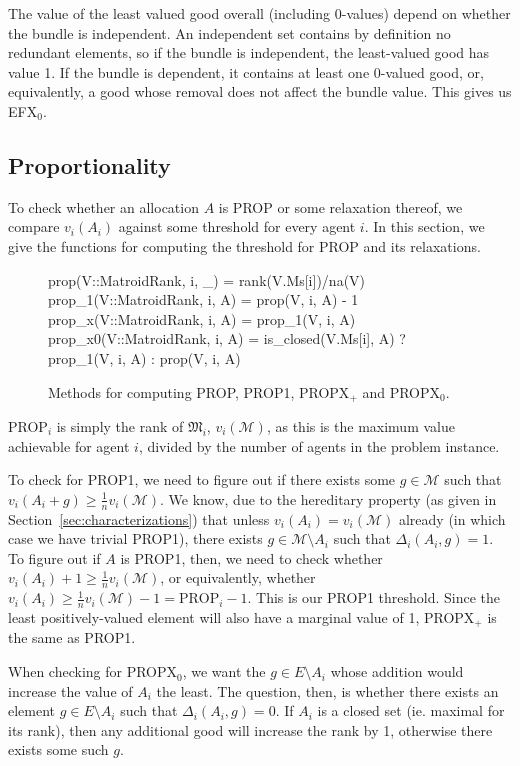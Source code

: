 The value of the least valued good overall (including 0-values) depend on whether the bundle is independent. An independent set contains by definition no redundant elements, so if the bundle is independent, the least-valued good has value 1. If the bundle is dependent, it contains at least one 0-valued good, or, equivalently, a good whose removal does not affect the bundle value. This gives us EFX$_0$.

\subsection*{Proportionality}
To check whether an allocation $A$ is PROP or some relaxation thereof, we compare $v_i(A_i)$ against some threshold for every agent $i$. In this section, we give the functions for computing the threshold for PROP and its relaxations.

\begin{figure}[ht!]
\begin{jllisting}
prop(V::MatroidRank, i, _) = rank(V.Ms[i])/na(V)
prop_1(V::MatroidRank, i, A) = prop(V, i, A) - 1
prop_x(V::MatroidRank, i, A) = prop_1(V, i, A)
prop_x0(V::MatroidRank, i, A) = 
    is_closed(V.Ms[i], A) ? prop_1(V, i, A) : prop(V, i, A)
\end{jllisting}
\caption{Methods for computing PROP, PROP1, PROPX$_+$ and PROPX$_0$.}
\end{figure}

PROP$_i$ is simply the rank of $\mathfrak{M}_i$, $v_i(\mathcal{M})$, as this is the maximum value achievable for agent $i$, divided by the number of agents in the problem instance.

To check for PROP1, we need to figure out if there exists some $g\in\mathcal{M}$ such that $v_i(A_i+g)\geq \frac{1}{n}v_i(\mathcal{M})$. We know, due to the hereditary property (as given in Section~\ref{sec:characterizations}) that unless $v_i(A_i) = v_i(\mathcal{M})$ already (in which case we have trivial PROP1), there exists $g\in\mathcal{M}\setminus A_i$ such that $\Delta_i(A_i, g) = 1$. To figure out if $A$ is PROP1, then, we need to check whether $v_i(A_i) + 1 \geq \frac{1}{n}v_i(\mathcal{M})$, or equivalently, whether $v_i(A_i) \geq \frac{1}{n}v_i(\mathcal{M})-1 = \text{PROP}_i - 1$. This is our PROP1 threshold. Since the least positively-valued element will also have a marginal value of 1, PROPX$_+$ is the same as PROP1.

When checking for PROPX$_0$, we want the $g\in E\setminus A_i$ whose addition would increase the value of $A_i$ the least. The question, then, is whether there exists an element $g\in E\setminus A_i$ such that $\Delta_i(A_i, g) = 0$. If $A_i$ is a closed set (ie. maximal for its rank), then any additional good will increase the rank by 1, otherwise there exists some such $g$.

